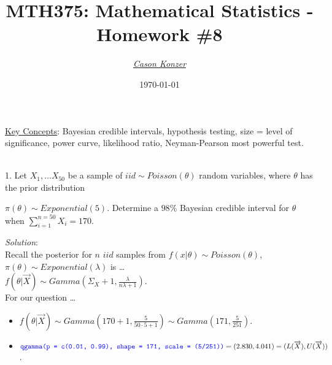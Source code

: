 \documentclass[12pt]{article}
\newcommand{\XB}{\color{black}}
\newcommand{\XBB}{\color{blue}}
\newcommand{\XV}{\color{violet}}
\newcommand{\ds}{\displaystyle}
\begin{document}
\title{\textbf{MTH375}: Mathematical Statistics - Homework \#8}
\date{\today}
\author{\XV\textit{\large{\href{https://github.com/casonk}{Cason Konzer}}}\XB}

\maketitle
\hrulefill
\vfill 
    \underline{Key Concepts}: Bayesian credible intervals, hypothesis testing, size = level of significance,
    power curve, likelihood ratio, Neyman-Pearson most powerful test.

\newpage
\newpage
\XBB\hrulefill\XB \\

1. Let $ \ds X_{1}, \dots X_{50} $ be a sample of $ iid \sim Poisson(\theta) $ random variables,
where $ \theta $ has the prior distribution 

$ \pi(\theta) \sim Exponential(5) $. 
Determine a $ 98\% $ Bayesian credible interval for $ \theta $ when $ \ds \sum_{i=1}^{n=50} X_{i} = 170 $. \\ 

\XBB\hrulefill\XB 
\vspace{5mm}

\vspace{2.5mm} 
\textit{Solution}:
\vspace{2.5mm} \\

\noindent
Recall the posterior for $ n $ $ iid $ samples from $ f(x | \theta) \sim Poisson(\theta) $, $ \pi(\theta) \sim Exponential(\lambda) $ is \dots \\ 

$ \ds f(\theta | \overrightarrow{X}) \sim Gamma( \Sigma_{X} + 1, \frac{\lambda}{n\lambda + 1} ) $. \\

\noindent
For our question \dots

\begin{itemize}
    \item $ \ds f(\theta | \overrightarrow{X}) \sim Gamma( 170 + 1, \frac{5}{50 \cdot 5 + 1} ) \sim Gamma( 171, \frac{5}{251} ) $.
    \item $ \ds {\XBB \texttt{qgamma(p = c(0.01, 0.99), shape = 171, scale = (5/251))}} = (2.830, 4.041) = (L(\overrightarrow{X}),U(\overrightarrow{X})) $.
\end{itemize}
\end{document}
